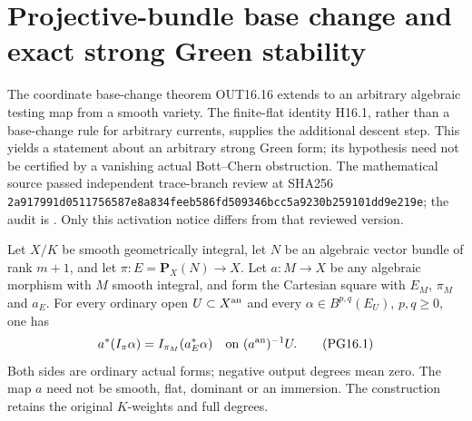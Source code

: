 \section{Projective-bundle base change and exact strong Green stability}
\label{r16pg:section}

The coordinate base-change theorem OUT16.16 extends to an arbitrary
algebraic testing map from a smooth variety. The finite-flat identity
H16.1, rather than a base-change rule for arbitrary currents, supplies
the additional descent step. This yields a statement about an arbitrary
strong Green form; its hypothesis need not be certified by a vanishing
actual Bott--Chern obstruction.
The mathematical source passed independent trace-branch review at
SHA256 \texttt{2a917991d0511756587e8a834feeb586fd509346bcc5a9230b259101dd9e219e};
the audit is
.
Only this activation notice differs from that reviewed version.

\begin{theorem}
\label{r16pg:base-change}
Let $X/K$ be smooth geometrically integral, let $N$ be an algebraic
vector bundle of rank $m+1$, and let $\pi:E=\mathbf P_X(N)\to X$.
Let $a:M\to X$ be any algebraic morphism with $M$ smooth integral,
and form the Cartesian square with $E_M$, $\pi_M$ and $a_E$.
For every ordinary open $U\subset X^{\rm an}$ and every
$\alpha\in B^{p,q}(E_U)$, $p,q\geq0$, one has
\[
 a^*(I_\pi\alpha)=I_{\pi_M}(a_E^*\alpha)
 \quad\text{on }(a^{\rm an})^{-1}U.
 \tag{PG16.1}\label{r16pg:bc}
\]
Both sides are ordinary actual forms; negative output degrees mean
zero. The map $a$ need not be smooth, flat, dominant or an immersion.
The construction retains the original $K$-weights and full degrees.
\end{theorem}

